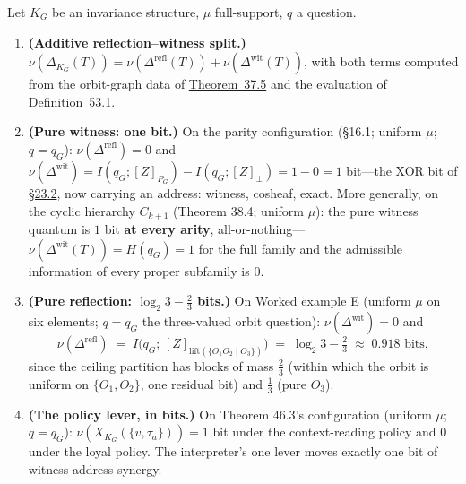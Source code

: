 \begin{thmplain}

Let \(K_G\) be an invariance structure, \(\mu\) full-support, \(q\) a question.

\begin{enumerate}
\def\labelenumi{\arabic{enumi}.}
\item
  \textbf{(Additive reflection--witness split.)} \(\nu(\Delta_{K_G}(T)) = \nu(\Delta^{\mathrm{refl}}(T)) + \nu(\Delta^{\mathrm{wit}}(T))\), with both terms computed from the orbit-graph data of \hyperlink{stmt:37.5}{Theorem~37.5} and the evaluation of \hyperlink{stmt:53.1}{Definition~53.1}.
\item
  \textbf{(Pure witness: one bit.)} On the parity configuration (§16.1; uniform \(\mu\); \(q = q_G\)): \(\nu(\Delta^{\mathrm{refl}}) = 0\) and \(\nu(\Delta^{\mathrm{wit}}) = I(q_G; [Z]_{P_G}) - I(q_G; [Z]_\bot) = 1 - 0 = 1\) bit---\hspace{0pt}the XOR bit of \hyperlink{sec:23.2}{§23.2}, now carrying an address: witness, cosheaf, exact. More generally, on the cyclic hierarchy \(C_{k+1}\) (Theorem 38.4; uniform \(\mu\)): the pure witness quantum is \(1\) bit \textbf{at every arity}, all-or-nothing---\hspace{0pt}\(\nu(\Delta^{\mathrm{wit}}(T)) = H(q_G) = 1\) for the full family and the admissible information of every proper subfamily is \(0\).
\item
  \textbf{(Pure reflection: \(\log_2 3 - \tfrac23\) bits.)} On Worked example E (uniform \(\mu\) on six elements; \(q = q_G\) the three-valued orbit question): \(\nu(\Delta^{\mathrm{wit}}) = 0\) and
  \[
  \nu(\Delta^{\mathrm{refl}}) \;=\; I\big(q_G;\, [Z]_{\mathrm{lift}(\{O_1O_2 \mid O_3\})}\big) \;=\; \log_2 3 - \tfrac23 \;\approx\; 0.918 \text{ bits},
  \]
  since the ceiling partition has blocks of mass \(\tfrac23\) (within which the orbit is uniform on \(\{O_1, O_2\}\), one residual bit) and \(\tfrac13\) (pure \(O_3\)).
\item
  \textbf{(The policy lever, in bits.)} On Theorem 46.3's configuration (uniform \(\mu\); \(q = q_G\)): \(\nu(X_{K_G}(\{v, \tau_a\})) = 1\) bit under the context-reading policy and \(0\) under the loyal policy. The interpreter's one lever moves exactly one bit of witness-address synergy.
\end{enumerate}
\end{thmplain}


